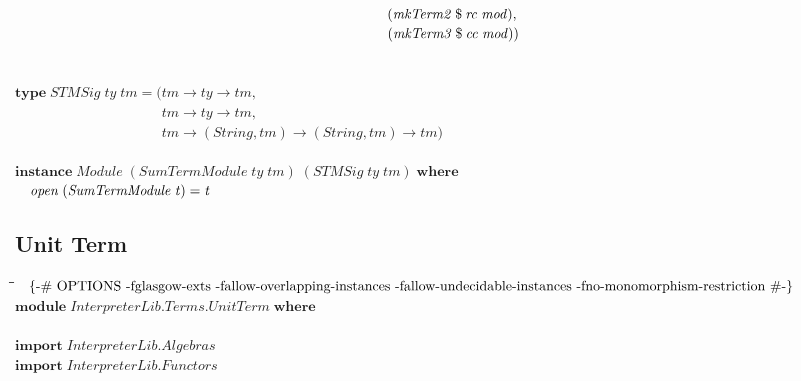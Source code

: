 \documentclass[10pt]{article}
\newlength{\lwidth}\setlength{\lwidth}{4.5cm}
\newlength{\cwidth}\setlength{\cwidth}{8mm} %
\newcommand{\Conid}[1]{\mathit{#1}}
\newcommand{\Varid}[1]{\mathit{#1}}
\begin{document}
\begin{tabbing}
${\hskip1.00em\relax\phantom{\mathbf{where}\;\Varid{mkModule}\;(\Varid{x}\mathbin{::}\Varid{ty})\;(\Varid{y}\mathbin{::}\Varid{tm})\mathrel{=}\mbox{}}\phantom{\mathbf{in}\;\Conid{SumTermModule}\;(\mbox{}}(\Varid{mkTerm2}\mathbin{\$}\Varid{rc}\;\Varid{mod}),}$\\
${\hskip1.00em\relax\phantom{\mathbf{where}\;\Varid{mkModule}\;(\Varid{x}\mathbin{::}\Varid{ty})\;(\Varid{y}\mathbin{::}\Varid{tm})\mathrel{=}\mbox{}}\phantom{\mathbf{in}\;\Conid{SumTermModule}\;(\mbox{}}(\Varid{mkTerm3}\mathbin{\$}\Varid{cc}\;\Varid{mod}))}$\\
${}$\\
${}$\\
${\mathbf{type}\;\Conid{STMSig}\;\Varid{ty}\;\Varid{tm}\mathrel{=}(\Varid{tm}\to \Varid{ty}\to \Varid{tm},}$\\
${\phantom{\mathbf{type}\;\Conid{STMSig}\;\Varid{ty}\;\Varid{tm}\mathrel{=}(\mbox{}}\Varid{tm}\to \Varid{ty}\to \Varid{tm},}$\\
${\phantom{\mathbf{type}\;\Conid{STMSig}\;\Varid{ty}\;\Varid{tm}\mathrel{=}(\mbox{}}\Varid{tm}\to (\Conid{String},\Varid{tm})\to (\Conid{String},\Varid{tm})\to \Varid{tm})}$\\
${}$\\
${\mathbf{instance}\;\Conid{Module}\;(\Conid{SumTermModule}\;\Varid{ty}\;\Varid{tm})\;(\Conid{STMSig}\;\Varid{ty}\;\Varid{tm})\;\mathbf{where}}$\\
${\hskip1.00em\relax\Varid{open}\;(\Conid{SumTermModule}\;\Varid{t})\mathrel{=}\Varid{t}}$
\end{tabbing}
\subsection{Unit Term}
\begin{tabbing}
\qquad\=\hspace{\lwidth}\=\hspace{\cwidth}\=\+\kill
${\mbox{\enskip\{-\# OPTIONS -fglasgow-exts -fallow-overlapping-instances -fallow-undecidable-instances -fno-monomorphism-restriction  \#-\}\enskip}}$\\
${\mathbf{module}\;\Conid{\Conid{InterpreterLib}.\Conid{Terms}.UnitTerm}\;\mathbf{where}}$\\
${}$\\
${\mathbf{import}\;\Conid{\Conid{InterpreterLib}.Algebras}}$\\
${\mathbf{import}\;\Conid{\Conid{InterpreterLib}.Functors}}$
\end{tabbing}
\end{document}
